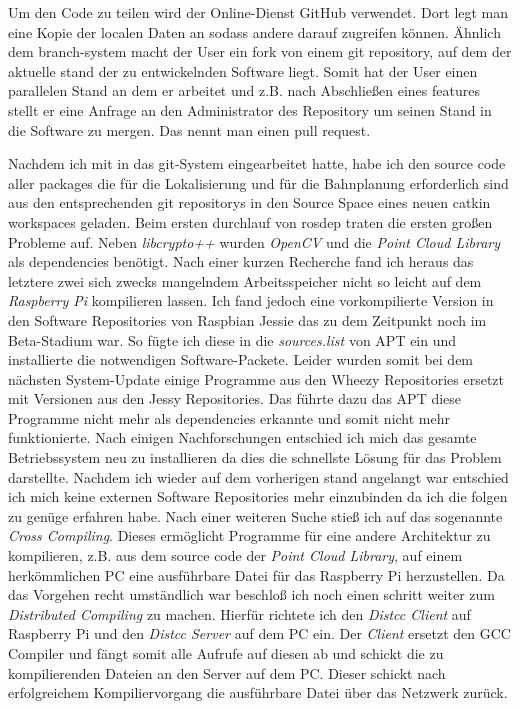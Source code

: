 Um den Code zu teilen wird der Online-Dienst GitHub verwendet. Dort legt man eine Kopie der localen Daten an sodass andere darauf zugreifen können. Ähnlich dem \Gls{branch}-system macht der User ein \Gls{fork} von einem \Gls{git repository}, auf dem der aktuelle stand der zu entwickelnden Software liegt. Somit hat der User einen parallelen Stand an dem er arbeitet und z.B. nach Abschließen eines \Gls{feature}s stellt er eine Anfrage an den Administrator des Repository  um seinen Stand in die Software zu \Gls{merge}n. Das nennt man einen \Gls{pull request}.

Nachdem ich mit in das git-System eingearbeitet hatte, habe ich den \Gls{source code} aller \Glspl{package} die für die Lokalisierung und für die Bahnplanung erforderlich sind aus den entsprechenden \Glspl{git repository} in den Source Space eines neuen \Gls{catkin workspace}s geladen.
Beim ersten durchlauf von \Gls{rosdep} traten die ersten großen Probleme auf. Neben \emph{libcrypto++} wurden \emph{OpenCV} und die \emph{Point Cloud Library} als \Glspl{dependencie} benötigt. Nach einer kurzen Recherche fand ich heraus das letztere zwei sich zwecks mangelndem Arbeitsspeicher nicht so leicht auf dem \emph{Raspberry Pi} kompilieren lassen. Ich fand jedoch eine vorkompilierte Version in den Software Repositories von Raspbian Jessie das zu dem Zeitpunkt noch im Beta-Stadium war. So fügte ich diese in die \emph{sources.list} von APT ein und installierte die notwendigen Software-Packete.
Leider wurden somit bei dem nächsten System-Update einige Programme aus den Wheezy Repositories ersetzt mit Versionen aus den Jessy Repositories. Das führte dazu das APT diese Programme nicht mehr als \Glspl{dependencie} erkannte und somit nicht mehr funktionierte. Nach einigen Nachforschungen entschied ich mich das gesamte Betriebssystem neu zu installieren da dies die schnellste Lösung für das Problem darstellte.
Nachdem ich wieder auf dem vorherigen stand angelangt war entschied ich mich keine externen Software Repositories mehr einzubinden da ich die folgen zu genüge erfahren habe.
Nach einer weiteren Suche stieß ich auf das sogenannte \emph{Cross Compiling}. Dieses ermöglicht Programme für eine andere Architektur zu kompilieren, z.B. aus dem \Gls{source code} der \emph{Point Cloud Library}, auf einem herkömmlichen PC eine ausführbare Datei für das Raspberry Pi herzustellen. Da das Vorgehen recht umständlich war beschloß ich noch einen schritt weiter zum \emph{Distributed Compiling} zu machen. Hierfür richtete ich den \emph{Distcc Client} auf Raspberry Pi und den \emph{Distcc Server} auf dem PC ein. Der \emph{Client} ersetzt den GCC Compiler und fängt somit alle Aufrufe auf diesen ab und schickt die zu kompilierenden Dateien an den Server auf dem PC. Dieser schickt nach erfolgreichem Kompiliervorgang die ausführbare Datei über das Netzwerk zurück. 
